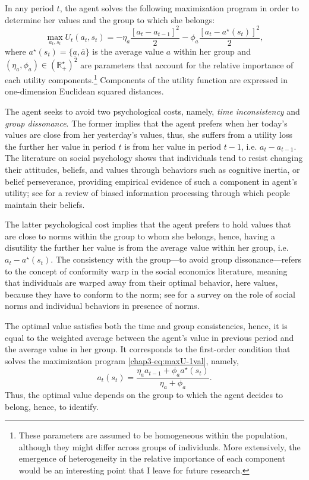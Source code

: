 In any period $t$, the agent solves the following maximization program in order to determine her values and the group to which she belongs:
\begin{equation}
    \max_{a_t, s_t} U_t(a_t, s_t) = -\eta_a\frac{\left[a_t-a_{t-1}\right]^2}{2} -\phi_a\frac{\left[a_t-a^\star(s_t)\right]^2}{2},\label{chap3-eq:maxU-1val}
\end{equation}
where $a^\star(s_t)=\{\underline{a}, \overline{a}\}$ is the average value $a$ within her group and $(\eta_a, \phi_a) \in (\mathbb{R}_{+}^\star)^2$ are parameters that account for the relative importance of each utility components.\footnote{These parameters are assumed to be homogeneous within the population, although they might differ across groups of individuals. More extensively, the emergence of heterogeneity in the relative importance of each component would be an interesting point that I leave for future research.} Components of the utility function are expressed in one-dimension Euclidean squared distances. 

The agent seeks to avoid two psychological costs, namely, \textit{time inconsistency} and \textit{group dissonance}. The former implies that the agent prefers when her today’s values are close from her yesterday’s values, thus, she suffers from a utility loss the further her value in period $t$ is from her value in period $t-1$, i.e. $a_t - a_{t-1}$. The literature on social psychology shows that individuals tend to resist changing their attitudes, beliefs, and values through behaviors such as cognitive inertia, or belief perseverance, providing empirical evidence of such a component in agent's utility; see \citet{Kunda1990Case} for a review of biased information processing through which people maintain their beliefs.

The latter psychological cost implies that the agent prefers to hold values that are close to norms within the group to whom she belongs, hence, having a disutility the further her value is from the average value within her group, i.e. $a_t-a^\star(s_t)$. The consistency with the group---to avoid group dissonance---refers to the concept of conformity warp in the social economics literature, meaning that individuals are warped away from their optimal behavior, here values, because they have to conform to the norm; see \citet{Burke2011Social} for a survey on the role of social norms and individual behaviors in presence of norms.

The optimal value satisfies both the time and group consistencies, hence, it is equal to the weighted average between the agent's value in previous period and the average value in her group. It corresponds to the first-order condition that solves the maximization program \eqref{chap3-eq:maxU-1val}, namely,
\begin{equation}\label{chap3-eq:foc-1val}
    a_t(s_t) =  \frac{\eta_a a_{t-1} + \phi_a a^\star(s_t)}{\eta_a + \phi_a}.
\end{equation}
Thus, the optimal value depends on the group to which the agent decides to belong, hence, to identify.

